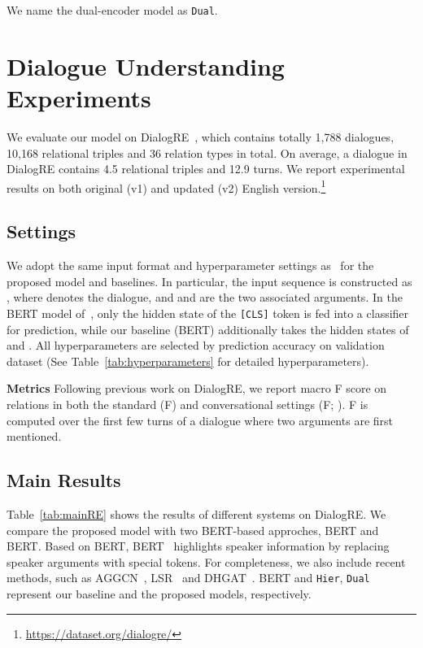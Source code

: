 \documentclass[11pt,a4paper]{article}
\begin{document}
We name the dual-encoder model as \texttt{Dual}.



\section{Dialogue Understanding Experiments}
We evaluate our model on DialogRE~\cite{yu-2020-dialogue}, which contains totally 1,788 dialogues, 10,168 relational triples and 36 relation types in total. 
On average, a dialogue in DialogRE contains 4.5 relational triples and 12.9 turns.
We report experimental results on both original (v1) and updated (v2) English version.\footnote{\url{https://dataset.org/dialogre/}}





\subsection{Settings}


We adopt the same input format and hyperparameter settings as~\citet{yu-2020-dialogue} for the proposed model and baselines.
In particular, the input sequence is constructed as , where  denotes the dialogue, and  and  are the two associated arguments.
In the BERT model of~\citet{yu-2020-dialogue}, only the hidden state of the \texttt{[CLS]} token is fed into a classifier for prediction, while our baseline (BERT) additionally takes the hidden states of  and .
All hyperparameters are selected by prediction accuracy on validation dataset (See Table~\ref{tab:hyperparameters} for detailed hyperparameters).

\noindent\textbf{Metrics} Following previous work on DialogRE, we report macro F score on relations in both the standard (F) and conversational settings (F; \citealp{yu-2020-dialogue}). 
F is computed over the first few turns of a dialogue where two arguments are first mentioned.

\subsection{Main Results}
Table~\ref{tab:mainRE} shows the results of different systems on DialogRE. 
We compare the proposed model with two BERT-based approches, BERT and BERT. 
Based on BERT, BERT~\cite{yu-2020-dialogue} highlights speaker information by replacing speaker arguments with special tokens.
For completeness, we also include recent methods, such as AGGCN~\cite{guo-etal-2019-attention}, LSR~\cite{nan-etal-2020-reasoning} and DHGAT~\cite{Chen20Dialogue}.
BERT and \texttt{Hier}, \texttt{Dual} represent our baseline and the proposed models, respectively. 
\end{document}
